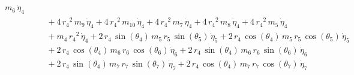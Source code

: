 \begin{eqnarray*}
\,m_{6}\,{\dot{\eta}_{4}} \\ &&\quad\mbox{} + 4\,{r_{4}}^2\,m_{9}\,{
\dot{\eta}_{4}} + 4\,{r_{4}}^2\,m_{10}\,{\dot{\eta}_{4}} + 4\,{r_{4}}^
2\,m_{7}\,{\dot{\eta}_{4}} + 4\,{r_{4}}^2\,m_{8}\,{\dot{\eta}_{4}} + 4
\,{r_{4}}^2\,m_{5}\,{\dot{\eta}_{4}} \\ &&\quad\mbox{} + m_{4}\,{r_{4}
}^2\,{\dot{\eta}_{4}} + 2\,r_{4}\,\sin({\theta_{4}})\,m_{5}\,r_{5}\,
\sin({\theta_{5}})\,{\dot{\eta}_{5}} + 2\,r_{4}\,\cos({\theta_{4}})\,m
_{5}\,r_{5}\,\cos({\theta_{5}})\,{\dot{\eta}_{5}} \\ &&\quad\mbox{} + 
2\,r_{4}\,\cos({\theta_{4}})\,m_{6}\,r_{6}\,\cos({\theta_{6}})\,{
\dot{\eta}_{6}} + 2\,r_{4}\,\sin({\theta_{4}})\,m_{6}\,r_{6}\,\sin({
\theta_{6}})\,{\dot{\eta}_{6}} \\ &&\quad\mbox{} + 2\,r_{4}\,\sin({
\theta_{4}})\,m_{7}\,r_{7}\,\sin({\theta_{7}})\,{\dot{\eta}_{7}} + 2\,
r_{4}\,\cos({\theta_{4}})\,m_{7}\,r_{7}\,\cos({\theta_{7}})\,{
\dot{\eta}_{7}} \end{eqnarray*}
